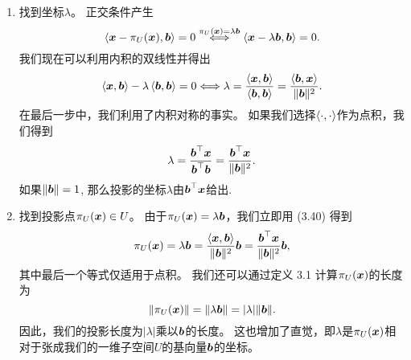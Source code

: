 \begin{enumerate}
    \item 找到坐标$\lambda$。 正交条件产生
    \begin{equation}
        \left\langle\boldsymbol{x} - \pi_U(\boldsymbol{x}),\boldsymbol{b}\right\rangle = 0
        \overset{\pi_U(\boldsymbol{x})=\lambda\boldsymbol{b}}{\Longleftrightarrow}
        \left\langle\boldsymbol{x} - \lambda\boldsymbol{b},\boldsymbol{b}\right\rangle = 0.
    \end{equation}
    我们现在可以利用内积的双线性并得出
    \begin{equation}
        \left\langle\boldsymbol{x},\boldsymbol{b}\right\rangle - \lambda\left\langle\boldsymbol{b},\boldsymbol{b}\right\rangle = 0
        \Longleftrightarrow
        \lambda = \frac{\left\langle\boldsymbol{x},\boldsymbol{b}\right\rangle}{\left\langle\boldsymbol{b},\boldsymbol{b}\right\rangle}
        = \frac{\left\langle\boldsymbol{b},\boldsymbol{x}\right\rangle}{\|\boldsymbol{b}\|^2}.
    \end{equation}
    在最后一步中，我们利用了内积对称的事实。
    如果我们选择$\left\langle\cdot,\cdot\right\rangle$作为点积，我们得到
    \begin{equation}
        \lambda =
        \frac{\boldsymbol{b}^\top\boldsymbol{x}}{\boldsymbol{b}^\top\boldsymbol{b}} =
        \frac{\boldsymbol{b}^\top\boldsymbol{x}}{\|\boldsymbol{b}\|^2}.
    \end{equation}
    如果$\|\boldsymbol{b}\|=1$, 那么投影的坐标$\lambda$由$\boldsymbol{b}^\top \boldsymbol{x}$给出.
    \item 找到投影点$\pi_U(\boldsymbol{x}) \in U$。
          由于$\pi_U(\boldsymbol{x}) = \lambda\boldsymbol{b}$，我们立即用 (3.40) 得到
          \begin{equation}
              \pi_U(\boldsymbol{x}) = \lambda\boldsymbol{b} =
              \frac{\left\langle\boldsymbol{x},\boldsymbol{b}\right\rangle}{\|\boldsymbol{b}\|^2}\boldsymbol{b} =
              \frac{\boldsymbol{b}^\top\boldsymbol{x}}{\|\boldsymbol{b}\|^2}\boldsymbol{b},
          \end{equation}
          其中最后一个等式仅适用于点积。
          我们还可以通过定义 3.1 计算$\pi_U(\boldsymbol{x})$的长度为
          \begin{equation}
              \|\pi_U(\boldsymbol{x})\| = \|\lambda\boldsymbol{b}\| = |\lambda|\|\boldsymbol{b}\|.
          \end{equation}
          因此，我们的投影长度为$|\lambda|$乘以$\boldsymbol{b}$的长度。
          这也增加了直觉，即$\lambda$是$\pi_U(\boldsymbol{x})$相对于张成我们的一维子空间$U$的基向量$\boldsymbol{b}$的坐标。


\end{enumerate}
